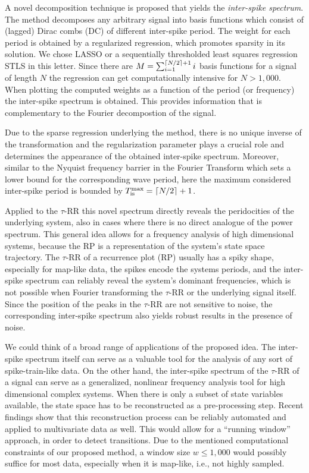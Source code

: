 \documentclass[entropy,article,submit,pdftex,moreauthors]{Definitions/mdpi}
\DeclarePairedDelimiter\ceil{\lceil}{\rceil}
\begin{document}
A novel decomposition technique is proposed that yields the \textit{inter-spike spectrum}. The method decomposes any arbitrary signal into basis functions which consist of (lagged) Dirac 
combs (DC) of different inter-spike period. The weight for each period is obtained by a regularized regression, which promotes sparsity in its solution. We chose LASSO or a sequentially 
thresholded least squares regression STLS in this letter. Since there are 
$M = \sum_{i=1}^{\ceil*{N/2}+1}i$ basis functions for a signal of length $N$ the regression can get computationally intensive for $N>1,000$. When plotting the computed weights as a function 
of the period (or frequency) the inter-spike spectrum is obtained. This provides information that is complementary to the Fourier decompostion of the signal.

Due to the sparse regression underlying the method, there is no unique inverse of the transformation and the regularization parameter plays a crucial role and determines the 
appearance of the obtained inter-spike spectrum. Moreover, similar to the Nyquist frequency barrier in the Fourier Transform which sets a lower bound for the corresponding wave period, here 
the maximum considered inter-spike period is bounded by $T_{\text{is}}^{\text{max}} = \ceil*{N/2}+1$.

Applied to the $\tau$-RR this novel spectrum directly reveals the peridocities of the underlying system, also in cases where there is no direct analogue of the power spectrum.
This general idea \cite{Zbilut2008} allows for a frequency analysis of high dimensional systems, because the RP is a representation of the system's state space trajectory.   
The $\tau$-RR of a recurrence plot (RP) usually has a spiky shape, especially for map-like data, the spikes encode the systems periods, and the inter-spike spectrum can reliably reveal the system's dominant frequencies, 
which is not possible when Fourier transforming the $\tau$-RR or the underlying signal itself. Since the position of the peaks 
in the $\tau$-RR are not sensitive to noise, the corresponding inter-spike spectrum also yields robust results in the presence of noise. 

We could think of a broad range of applications of the proposed idea. The inter-spike spectrum itself can serve as a valuable tool for the analysis of any sort of 
spike-train-like data. On the other hand, the inter-spike spectrum of the $\tau$-RR of a signal can serve as a generalized, nonlinear frequency analysis tool for high dimensional complex systems. 
When there is only a subset of state variables available, the state space has to be reconstructed as a pre-processing step. Recent findings \cite{Kraemer2021,Kraemer2022} show that 
this reconstruction process can be reliably automated and applied to multivariate data as well. This would allow for a ``running window'' approach, in order to detect transitions. 
Due to the mentioned computational constraints of our proposed method, a window size $w\leq 1,000$ would possibly suffice for most data, especially when it is map-like, i.e., not 
highly sampled. 
\end{document}
